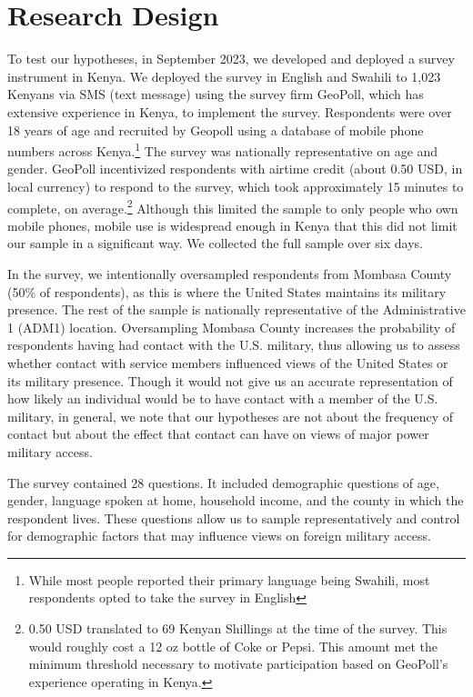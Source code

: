 \section*{Research Design}

To test our hypotheses, in September 2023, we developed and deployed a survey instrument in Kenya. We deployed the survey in English and Swahili to 1,023 Kenyans via SMS (text message) using the survey firm GeoPoll, which has extensive experience in Kenya, to implement the survey. Respondents were over 18 years of age and recruited by Geopoll using a database of mobile phone numbers across Kenya.\footnote{While most people reported their primary language being Swahili, most respondents opted to take the survey in English} The survey was nationally representative on age and gender. GeoPoll incentivized respondents with airtime credit (about 0.50 USD, in local currency) to respond to the survey, which took approximately 15 minutes to complete, on average.\footnote{0.50 USD translated to 69 Kenyan Shillings at the time of the survey. This would roughly cost a 12 oz bottle of Coke or Pepsi. This amount met the minimum threshold necessary to motivate participation based on GeoPoll's experience operating in Kenya.} Although this limited the sample to only people who own mobile phones, mobile use is widespread enough in Kenya that this did not limit our sample in a significant way. We collected the full sample over six days.  

In the survey, we intentionally oversampled respondents from Mombasa County (50\% of respondents), as this is where the United States maintains its military presence. The rest of the sample is nationally representative of the Administrative 1 (ADM1) location. Oversampling Mombasa County increases the probability of respondents having had contact with the U.S. military, thus allowing us to assess whether contact with service members influenced views of the United States or its military presence. Though it would not give us an accurate representation of how likely an individual would be to have contact with a member of the U.S. military, in general, we note that our hypotheses are not about the frequency of contact but about the effect that contact can have on views of major power military access. 

The survey contained 28 questions. It included demographic questions of age, gender, language spoken at home, household income, and the county in which the respondent lives. These questions allow us to sample representatively and control for demographic factors that may influence views on foreign military access.

